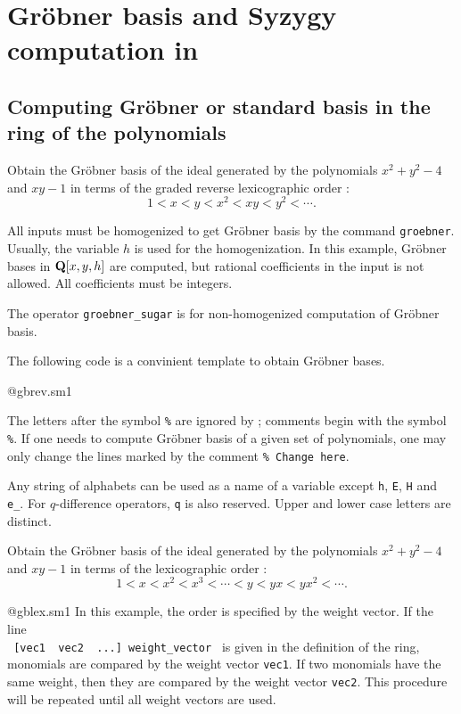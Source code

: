 \section{Gr\"obner basis and Syzygy computation in \kansm}
\subsection{Computing Gr\"obner or standard basis in the ring of the polynomials}

\begin{example}
Obtain the Gr\"obner basis of the ideal generated by 
the polynomials $x^2+y^2-4$ and $xy-1$ in terms of the graded reverse
lexicographic order :
$$ 1 < x < y < x^2 < xy < y^2 < \cdots. $$
\end{example}
 
All inputs must be homogenized to get Gr\"obner basis
by the command {\tt groebner}. 
Usually, the variable $h$ is used for the homogenization.
In this example,
Gr\"obner bases in 
${\bf Q}[x,y,h]$ are computed, 
but rational coefficients in the input is not allowed.
All coefficients must be integers.

The operator {\tt groebner\_sugar} is for non-homogenized
computation of Gr\"obner basis.

The following code is a convinient template to obtain
Gr\"obner bases.

@gbrev.sm1

The letters after the symbol {\tt \%} are ignored by \kansm ;
comments begin with the symbol {\tt \%}.
If one needs to compute Gr\"obner basis of a given set of polynomials,
one may only change the lines marked by the comment
{\tt \% Change here}.

\begin{grammer}
Any string of alphabets can be used as a name of a variable except
{\tt h}, {\tt E}, {\tt H} and {\tt e\_}.
For $q$-difference operators, {\tt q} is also reserved.
Upper and lower case letters are distinct.
\end{grammer}

\bigbreak

\begin{example}
Obtain the Gr\"obner basis of the ideal generated by 
the polynomials $x^2+y^2-4$ and $xy-1$ in terms of the 
lexicographic order :
$$ 1 < x < x^2 < x^3 < \cdots < y < yx < yx^2 < \cdots. $$
\end{example}


@gblex.sm1
In this example, the order is specified by the weight vector.
If the line \\
\verb+ [vec1  vec2  ...] weight_vector +
is given in the definition of the ring,
monomials are compared by the weight vector {\tt vec1}.
If two monomials have the same weight, then they are
compared by the weight vector {\tt vec2}.
This procedure will be repeated until all weight vectors are used.

